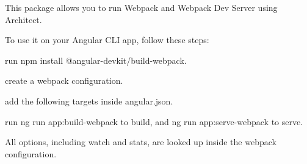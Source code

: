 This package allows you to run Webpack and Webpack Dev Server using Architect.

To use it on your Angular CLI app, follow these steps\+:


\begin{DoxyItemize}
\item run {\ttfamily npm install @angular-\/devkit/build-\/webpack}.
\item create a webpack configuration.
\item add the following targets inside {\ttfamily angular.\+json}.
\end{DoxyItemize}


\begin{DoxyCode}{0}
\DoxyCodeLine{        \}}
\DoxyCodeLine{      \},}
\DoxyCodeLine{        \}}
\DoxyCodeLine{      \}}
\DoxyCodeLine{    \}}

\end{DoxyCode}



\begin{DoxyItemize}
\item run {\ttfamily ng run app\+:build-\/webpack} to build, and {\ttfamily ng run app\+:serve-\/webpack} to serve.
\end{DoxyItemize}

All options, including {\ttfamily watch} and {\ttfamily stats}, are looked up inside the webpack configuration. 